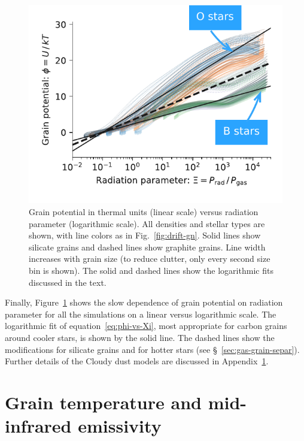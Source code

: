 \begin{figure}
  \centering
  \includegraphics[width=\linewidth]{figs/phi-versus-xi-annotate}
  \caption{Grain potential in thermal units (linear scale) versus
    radiation parameter (logarithmic scale). All densities and stellar
    types are shown, with line colors as in Fig.~\ref{fig:drift-gn}.
    Solid lines show silicate grains and dashed lines show graphite
    grains.  Line width increases with grain size (to reduce clutter,
    only every second size bin is shown).  The solid and dashed lines
    show the logarithmic fits discussed in the text.}
  \label{fig:phi-vs-Xi}
\end{figure}
Finally, Figure~\ref{fig:phi-vs-Xi} shows the slow dependence of grain
potential on radiation parameter for all the simulations on a linear
versus logarithmic scale.  The logarithmic fit of
equation~\eqref{eq:phi-vs-Xi}, most appropriate for carbon grains
around cooler stars, is shown by the solid line.  The dashed lines
show the modifications for silicate grains and for hotter stars (see
\S~\ref{sec:gas-grain-separ}).  Further details of the Cloudy dust
models are discussed in Appendix~\ref{sec:grain-temp-emiss}.

\section{Grain temperature and mid-infrared emissivity}
\label{sec:grain-temp-emiss}


